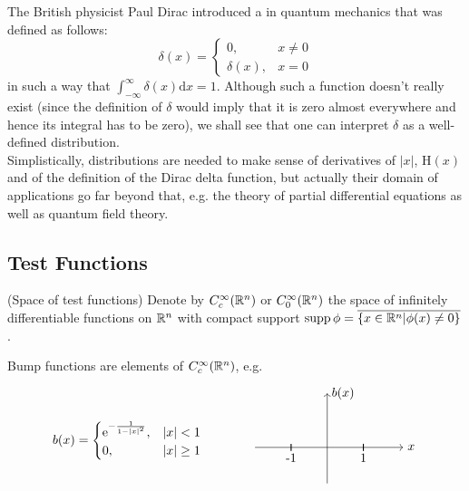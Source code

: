 \documentclass[11pt]{article}
\begin{document}
			\noindent The British physicist Paul Dirac introduced a  in quantum mechanics that was defined as follows:
			\begin{equation*}
				\delta(x)=\begin{cases}
					0, & x\neq0\\
					\delta(x), & x=0
				\end{cases}
			\end{equation*}
			in such a way that $\int_{-\infty}^\infty \delta(x)\mathrm{d}x=1$. Although such a function doesn't really exist (since the definition of $\delta$ would imply that it is zero almost everywhere and hence its integral has to be zero), we shall see that one can interpret $\delta$ as a well-defined distribution.
			\\

			Simplistically, distributions are needed to make sense of derivatives of $|x|$, $\mathrm{H}(x)$ and of the definition of the Dirac delta function, but actually their domain of applications go far beyond that, e.g. the theory of partial differential equations as well as quantum field theory.


		\subsection{Test Functions}

			\begin{defi}(Space of test functions)
				Denote by $C^\infty_c(\mathbb{R}^n)$ or $C_0^\infty(\mathbb{R}^n)$ the space of infinitely differentiable functions on $\mathbb{R}^n$ with compact support $\operatorname{supp}\phi=\overline{\{x\in\mathbb{R}^n|\phi(x)\neq0\}}$.
			\end{defi}

			\begin{eg}
				Bump functions are elements of $C^\infty_c(\mathbb{R}^n)$, e.g.
				\begin{equation*}
					b(x)=\begin{cases}
						\e{-\frac{1}{1-|x|^2}}, & |x|<1\\
						0, & |x|\ge1
					\end{cases}\qquad\qquad
					\begin{tikzpicture}[baseline=.1cm]
						\draw[->] (-2,0)--(2.1,0) node [right]{$x$};
						\draw[->] (0,-1)--(0,1.5) node [right]{$b(x)$};
						\draw[thick](1,-.1)--(1,.1) node [below,yshift=-1.5mm]{1};
						\draw[thick](-1,-.1)--(-1,.1) node [below,yshift=-1.5mm]{-1};
						\draw[line width=.5mm] plot [smooth] file {plots/bump.table};
						\draw[line width=.5mm] plot [smooth] file {plots/bump1.table};
					\end{tikzpicture}
				\end{equation*}
			\end{eg}
\end{document}
